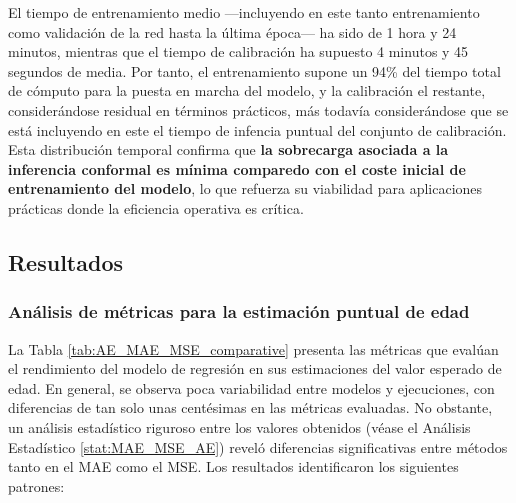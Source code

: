 El tiempo de entrenamiento medio ---incluyendo en este tanto entrenamiento como validación de la red hasta la última época--- ha sido de 1 hora y 24 minutos, mientras que el tiempo de calibración ha supuesto 4 minutos y 45 segundos de media. Por tanto, el entrenamiento supone un 94\% del tiempo total de cómputo para la puesta en marcha del modelo, y la calibración el restante, considerándose residual en términos prácticos, más todavía considerándose que se está incluyendo en este el tiempo de infencia puntual del conjunto de calibración. Esta distribución temporal confirma que \textbf{la sobrecarga asociada a la inferencia conformal es mínima comparedo con el coste inicial de entrenamiento del modelo}, lo que refuerza su viabilidad para aplicaciones prácticas donde la eficiencia operativa es crítica.




\subsection{Resultados}

\subsubsection{Análisis de métricas para la estimación puntual de edad}

La Tabla \ref{tab:AE_MAE_MSE_comparative} presenta las métricas que evalúan el rendimiento del modelo de regresión en sus estimaciones del valor esperado de edad. En general, se observa poca variabilidad entre modelos y ejecuciones, con diferencias de tan solo unas centésimas en las métricas evaluadas. No obstante, un análisis estadístico riguroso entre los valores obtenidos (véase el Análisis Estadístico \ref{stat:MAE_MSE_AE}) reveló diferencias significativas entre métodos tanto en el MAE como el MSE. Los resultados identificaron los siguientes patrones:

